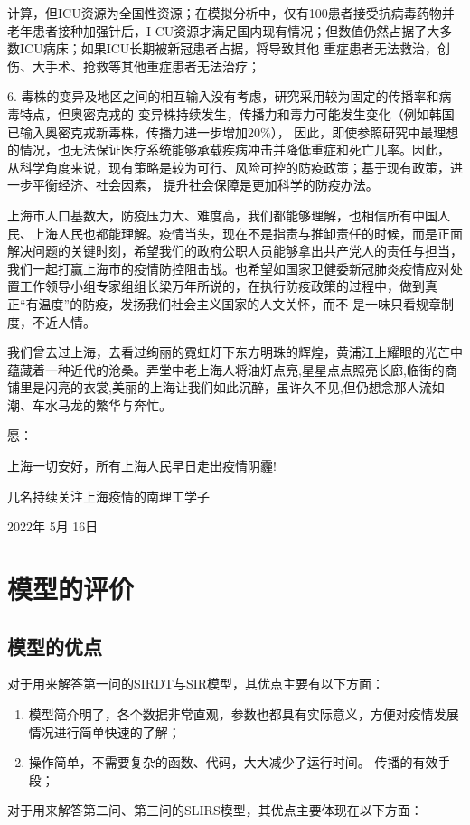 \documentclass[bwprint]{gmcmthesis}
\numberwithin{figure}{section}
\begin{document}
计算，但ICU资源为全国性资源；在模拟分析中，仅有100患者接受抗病毒药物并老年患者接种加强针后，I
CU资源才满足国内现有情况；但数值仍然占据了大多数ICU病床；如果ICU长期被新冠患者占据，将导致其他
重症患者无法救治，创伤、大手术、抢救等其他重症患者无法治疗；
\par 6. 毒株的变异及地区之间的相互输入没有考虑，研究采用较为固定的传播率和病毒特点，但奥密克戎的
变异株持续发生，传播力和毒力可能发生变化（例如韩国已输入奥密克戎新毒株，传播力进一步增加20$\%$），
因此，即使参照研究中最理想的情况，也无法保证医疗系统能够承载疾病冲击并降低重症和死亡几率。因此，
从科学角度来说，现有策略是较为可行、风险可控的防疫政策；基于现有政策，进一步平衡经济、社会因素，
提升社会保障是更加科学的防疫办法。
\par 上海市人口基数大，防疫压力大、难度高，我们都能够理解，也相信所有中国人民、上海人民也都能理解。疫情当头，现在不是指责与推卸责任的时候，而是正面解决问题的关键时刻，希望我们的政府公职人员能够拿出共产党人的责任与担当，我们一起打赢上海市的疫情防控阻击战。也希望如国家卫健委新冠肺炎疫情应对处置工作领导小组专家组组长梁万年所说的，在执行防疫政策的过程中，做到真正“有温度”的防疫，发扬我们社会主义国家的人文关怀，而不
是一味只看规章制度，不近人情。
\par 我们曾去过上海，去看过绚丽的霓虹灯下东方明珠的辉煌，黄浦江上耀眼的光芒中蕴藏着一种近代的沧桑。弄堂中老上海人将油灯点亮,星星点点照亮长廊,临街的商铺里是闪亮的衣裳,美丽的上海让我们如此沉醉，虽许久不见,但仍想念那人流如潮、车水马龙的繁华与奔忙。
\\
\par 愿：
\begin{flushleft}
    上海一切安好，所有上海人民早日走出疫情阴霾!
\end{flushleft}
\begin{flushright}
    几名持续关注上海疫情的南理工学子
    \par 2022年 5月 16日
\end{flushright}

\section{模型的评价}
\subsection{模型的优点}
\par 对于用来解答第一问的SIRDT与SIR模型，其优点主要有以下方面：
\begin{enumerate}
  \item 模型简介明了，各个数据非常直观，参数也都具有实际意义，方便对疫情发展情况进行简单快速的了解；
  \item 操作简单，不需要复杂的函数、代码，大大减少了运行时间。
  传播的有效手段；
  \end{enumerate}
\par 对于用来解答第二问、第三问的SLIRS模型，其优点主要体现在以下方面：
\end{document}

